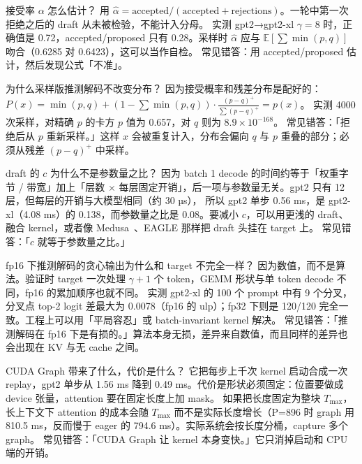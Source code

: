 \documentclass[11pt,a4paper]{ctexart}
\begin{document}
\begin{iqbox}{接受率 $\alpha$ 怎么估计？}
用 $\hat\alpha = \text{accepted}/(\text{accepted}+\text{rejections})$。一轮中第一次拒绝之后的 draft 从未被检验，不能计入分母。
实测 gpt2→gpt2-xl $\gamma{=}8$ 时，正确值是 0.72，accepted/proposed 只有 0.28。采样时 $\hat\alpha$ 应与 $\mathbb{E}[\sum\min(p,q)]$ 吻合（0.6285 对 0.6423），这可以当作自检。
\tcblower
常见错答：用 accepted/proposed 估计，然后发现公式「不准」。
\end{iqbox}

\begin{iqbox}{为什么采样版推测解码不改变分布？}
因为接受概率和残差分布是配好的：$P(x)=\min(p,q)+(1-\sum\min(p,q))\cdot\frac{(p-q)^+}{\sum(p-q)^+}=p(x)$。
实测 4000 次采样，对精确 $p$ 的卡方 $p$ 值为 0.657，对 $q$ 则为 $8.9\times10^{-168}$。
\tcblower
常见错答：「拒绝后从 $p$ 重新采样。」这样 $x$ 会被重复计入，分布会偏向 $q$ 与 $p$ 重叠的部分；必须从残差 $(p-q)^+$ 中采样。
\end{iqbox}

\begin{iqbox}{draft 的 $c$ 为什么不是参数量之比？}
因为 batch 1 decode 的时间约等于「权重字节 / 带宽」加上「层数 $\times$ 每层固定开销」，后一项与参数量无关。gpt2 只有 12 层，但每层的开销与大模型相同（约 30 µs），
所以 gpt2 单步 0.56 ms，是 gpt2-xl（4.08 ms）的 0.138，而参数量之比是 0.08。要减小 $c$，可以用更浅的 draft、融合 kernel，或者像 Medusa~\cite{medusa}、EAGLE 那样把 draft 头挂在 target 上。
\tcblower
常见错答：「$c$ 就等于参数量之比。」
\end{iqbox}

\begin{iqbox}{fp16 下推测解码的贪心输出为什么和 target 不完全一样？}
因为数值，而不是算法。验证时 target 一次处理 $\gamma{+}1$ 个 token，GEMM 形状与单 token decode 不同，fp16 的累加顺序也就不同。
实测 gpt2-xl 的 100 个 prompt 中有 9 个分叉，分叉点 top-2 logit 差最大为 0.0078（fp16 的 ulp）；fp32 下则是 120/120 完全一致。工程上可以用「平局容忍」或 batch-invariant kernel 解决。
\tcblower
常见错答：「推测解码在 fp16 下是有损的。」算法本身无损，差异来自数值，而且同样的差异也会出现在 KV 与无 cache 之间。
\end{iqbox}

\begin{iqbox}{CUDA Graph 带来了什么，代价是什么？}
它把每步上千次 kernel 启动合成一次 replay，gpt2 单步从 1.56 ms 降到 0.49 ms。代价是形状必须固定：位置要做成 device 张量，attention 要在固定长度上加 mask。
如果把长度固定为整块 $T_{\max}$，长上下文下 attention 的成本会随 $T_{\max}$ 而不是实际长度增长（P=896 时 graph 用 810.5 ms，反而慢于 eager 的 794.6 ms）。实际系统会按长度分桶，capture 多个 graph。
\tcblower
常见错答：「CUDA Graph 让 kernel 本身变快。」它只消掉启动和 CPU 端的开销。
\end{iqbox}
\end{document}
